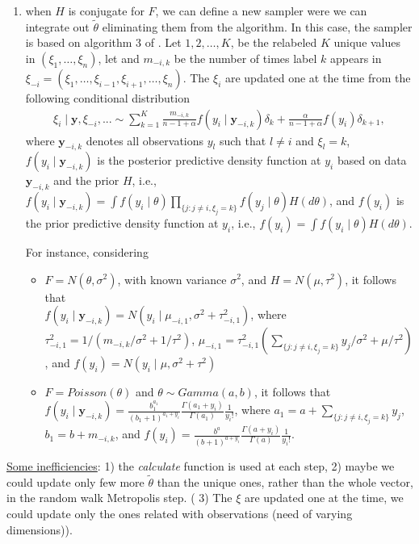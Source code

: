 \documentclass[12pt]{article}
\newcommand{\by}{\boldsymbol{y}}
\begin{document}
\begin{enumerate}
\begin{enumerate}
\item when $H$ is conjugate for $F$, we can define a new sampler were we can integrate out $\tilde{\theta}$ eliminating them from the algorithm. In this case, the sampler is  based on algorithm 3 of \cite{neal;2000}. Let $1, 2, \ldots, K$, be the relabeled  $K$ unique values in $(\xi_1, \ldots, \xi_n)$, let and $m_{-i,k}$ be the number of times label $k$ appears in $\xi_{-i}=(\xi_1, \ldots, \xi_{i-1}, \xi_{i+1}, \ldots, \xi_n)$.  The $\xi_i$ are updated one at the time  from the following conditional distribution
\begin{align*}
\xi_i\mid \boldsymbol{y}, \xi_{-i},... \sim \sum_{k =1 }^K\frac{m_{-i,k}}{n-1+\alpha}f(y_i\mid \by_{-i,k})\delta_{k} +\frac{\alpha}{n-1+\alpha}f(y_i)\delta_{k+1},
\end{align*}
where $\by_{-i, k}$ denotes all observations $y_l$ such that $l\neq i$ and $\xi_l=k$,  $f(y_i\mid \by_{-i, k})$ is the posterior predictive density function  at $y_i$ based on data $\by_{-i, k}$ and the prior $H$, i.e., $f(y_i\mid \by_{-i, k})=\int f(y_i\mid \theta)\prod_{\{j : j\neq i, \xi_j=k\}}f(y_j\mid \theta)H(d\theta) $,  and $f(y_i)$ is the prior predictive density function at $y_i$, i.e., $f(y_i)=\int f(y_i\mid \theta)H(d\theta)$. 

For instance, considering
\begin{itemize}
\item $F=N(\theta, \sigma^2)$, with known variance $\sigma^2$, and $H=N(\mu, \tau^2)$, it follows that \\$f(y_i\mid \by_{-i, k})=N\left(y_i \mid \mu_{-i,1}, \sigma^2+ \tau^2_{-i,1} \right)$, where $\tau^2_{-i,1}=1/\left(m_{-i,k}/\sigma^2 + 1/\tau^2 \right)$,  $\mu_{-i,1}=\tau^2_{-i,1}\left(\sum_{\{j: j\neq i, \xi_j=k\}}y_j/\sigma^2 +\mu/\tau^2 \right)$,  and $f(y_i)=N(y_i \mid \mu, \sigma^2+\tau^2)$
\item $F=Poisson(\theta)$  and $\theta \sim Gamma(a,b)$, it follows that \\
$f(y_i\mid \by_{-i, k})=\frac{b_{1}^{a_{1 }}}{(b_1+1)^{a_1+y_i}}\frac{\Gamma(a_1+y_i)}{\Gamma(a_{1})}\frac{1}{y_i!}$, where $a_1=a+\sum_{\{j: j\neq i, \xi_j=k\}}y_j$, $b_1=b+m_{-i,k}$, and $f(y_i)=\frac{b^a}{(b+1)^{a+y_i}}\frac{\Gamma(a+y_i)}{\Gamma(a)}\frac{1}{y_i!}$.
\end{itemize}
\end{enumerate} 
 
 
\underline{Some inefficiencies}:  1) the \textit{calculate} function is used at each step, 2) maybe we could update only few more $\tilde{\theta}$ than the unique ones, rather than the whole vector, in the random walk Metropolis step. ( 3) The $\xi$ are updated one at the time, we could update only the ones related with observations (need of varying dimensions)).




\end{enumerate}
\end{document}

